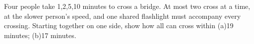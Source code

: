 Four people take 1,2,5,10 minutes to cross a bridge. At most two cross at a time, at the slower person's speed, and one shared flashlight must accompany every crossing. Starting together on one side, show how all can cross within (a)19 minutes; (b)17 minutes.
